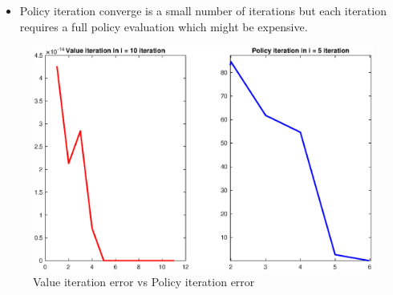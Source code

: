 \documentclass[a4paper,10pt]{article}
\begin{document}
\begin{enumerate}[label=\underline{\textbf{Q\arabic*}:}]
\begin{itemize}
\item Policy iteration converge is a small number of iterations but each iteration requires a full policy evaluation which might be expensive. 
\end{itemize}
\begin{figure}[!h]
        \includegraphics[width=.95\linewidth]{ValuevsPolicy.eps}  
        \caption{Value iteration error vs Policy iteration error }%
\end{figure}

\end{enumerate}
\end{document}
